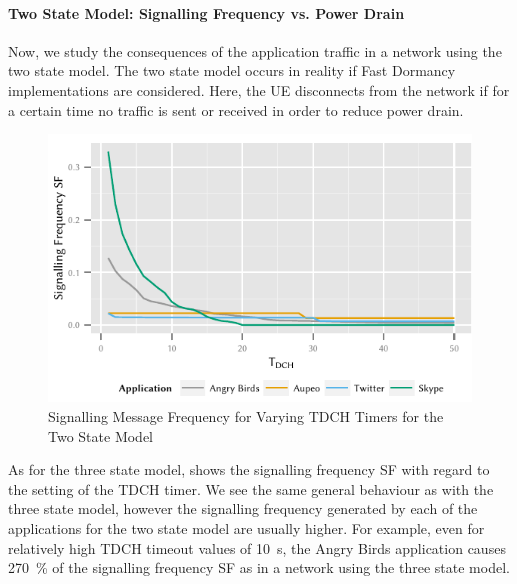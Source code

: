 \paragraph*{Two State Model: Signalling Frequency vs. Power Drain}\label{sec:network:network_traces:numerical_results:two_states}
Now, we study the consequences of the application traffic in a network using the two state model.
The two state model occurs in reality if Fast Dormancy implementations are considered.
Here, the \gls{UE} disconnects from the network if for a certain time no traffic is sent or received in order to reduce power drain.
\begin{figure}
	\centering
	\includegraphics{network/network_traces/numerical_results/figures/2_state_tdch_vs_frequency}
	\caption{Signalling Message Frequency for Varying \gls{TDCH} Timers for the Two State Model}\label{fig:network:network_traces:numerical_results:two_states:signalling}
\end{figure}
As for the three state model,  shows the signalling frequency \gls{SF} with regard to the setting of the \gls{TDCH} timer.
We see the same general behaviour as with the three state model, however the signalling frequency generated by each of the applications for the two state model are usually higher.
For example, even for relatively high \gls{TDCH} timeout values of \SI{10}{\second}, the Angry Birds application causes \SI{270}{\percent} of the signalling frequency \gls{SF} as in a network using the three state model.

